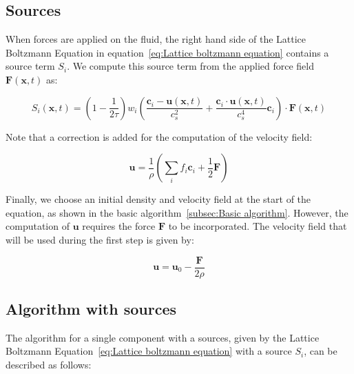 \subsection{Sources}
When forces are applied on the fluid, the right hand side of the Lattice Boltzmann Equation in equation~\ref{eq:Lattice boltzmann equation} contains a source term $S_i$. We compute this source term from the applied force field $\bm{F}(\bm{x}, t)$ as:

\begin{equation}\label{eq:Source term}
    S_i(\bm{x}, t) = \left(1 - \frac{1}{2\tau}\right) w_i \left(\frac{\bm{c}_i - \bm{u}(\bm{x}, t)}{c_s^2} + \frac{\bm{c}_i \cdot \bm{u}(\bm{x}, t)}{c_s^4}\bm{c}_i\right) \cdot \bm{F}(\bm{x}, t)
\end{equation}

Note that a correction is added for the computation of the velocity field:

\begin{equation}\label{eq:Velocity with correction}
    \bm{u} = \frac{1}{\rho} \left(\sum_i f_i \bm{c}_i + \frac{1}{2}\bm{F}\right)
\end{equation}

Finally, we choose an initial density and velocity field at the start of the equation, as shown in the basic algorithm~\ref{subsec:Basic algorithm}. However, the computation of $\bm{u}$ requires the force $\bm{F}$ to be incorporated. The velocity field that will be used during the first step is given by:

\begin{equation}
    \bm{u} = \bm{u}_0 - \frac{\bm{F}}{2\rho}
\end{equation}

\subsection{Algorithm with sources}
The algorithm for a single component with a sources, given by the Lattice Boltzmann Equation~\ref{eq:Lattice boltzmann equation} with a source $S_i$, can be described as follows:

